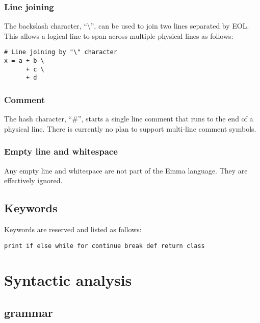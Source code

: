 \documentclass[10pt,a4paper]{article}
\begin{document}
\subsubsection{Line joining}
The backslash character, ``\textbackslash'', can be used to join two lines 
separated by EOL.
This allows a logical line to span across multiple physical lines as follows:
\begin{lstlisting}
# Line joining by "\" character
x = a + b \
      + c \
      + d
\end{lstlisting}

\subsubsection{Comment}
The hash character, ``\#'', starts a single line comment that runs to the end
of a physical line. There is currently no plan to support multi-line
comment symbols.

\subsubsection{Empty line and whitespace}
Any empty line and whitespace are not part of the Emma language. They are
effectively ignored.

\subsection{Keywords}
Keywords are reserved and listed as follows:
\begin{lstlisting}
print if else while for continue break def return class
\end{lstlisting}

\pagebreak


\section{Syntactic analysis}
\subsection{grammar}

\setlength{\grammarparsep}{10pt plus 1pt minus 1pt} %
\setlength{\grammarindent}{12em} %
\end{document}
